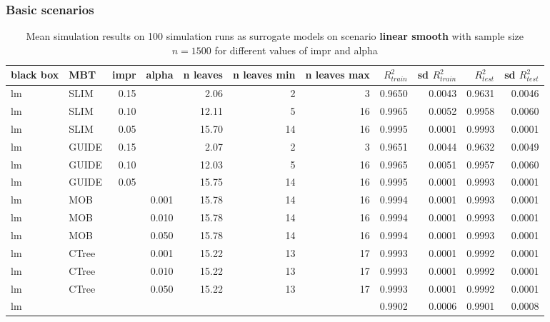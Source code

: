 \subsubsection{Basic scenarios}
\begin{table}[!htb]

\caption{Mean simulation results on 100 simulation runs as surrogate models on scenario \textbf{linear smooth} with sample size $n = 1500$ for different values of impr and alpha}
\centering \tiny
\begin{tabular}[t]{l|l|r|r|r|r|r|r|r|r|r}
\hline
black box & MBT & impr & alpha & n leaves & n leaves min & n leaves max &  $R^2_{train}$ & sd $R^2_{train}$ & $R^2_{test}$ & sd $R^2_{test}$\\
\hline
lm & SLIM & 0.15 & & 2.06 & 2 & 3 & 0.9650 & 0.0043 & 0.9631 & 0.0046\\
lm & SLIM & 0.10 & & 12.11 & 5 & 16 & 0.9965 & 0.0052 & 0.9958 & 0.0060\\
lm & SLIM & 0.05 & & 15.70 & 14 & 16 & 0.9995 & 0.0001 & 0.9993 & 0.0001\\
lm & GUIDE & 0.15 & & 2.07 & 2 & 3 & 0.9651 & 0.0044 & 0.9632 & 0.0049\\
lm & GUIDE & 0.10 & & 12.03 & 5 & 16 & 0.9965 & 0.0051 & 0.9957 & 0.0060\\
lm & GUIDE & 0.05 & & 15.75 & 14 & 16 & 0.9995 & 0.0001 & 0.9993 & 0.0001\\
lm & MOB & & 0.001 & 15.78 & 14 & 16 & 0.9994 & 0.0001 & 0.9993 & 0.0001\\
lm & MOB & & 0.010 & 15.78 & 14 & 16 & 0.9994 & 0.0001 & 0.9993 & 0.0001\\
lm & MOB & & 0.050 & 15.78 & 14 & 16 & 0.9994 & 0.0001 & 0.9993 & 0.0001\\
lm & CTree & & 0.001 & 15.22 & 13 & 17 & 0.9993 & 0.0001 & 0.9992 & 0.0001\\
lm & CTree & & 0.010 & 15.22 & 13 & 17 & 0.9993 & 0.0001 & 0.9992 & 0.0001\\
lm & CTree & & 0.050 & 15.22 & 13 & 17 & 0.9993 & 0.0001 & 0.9992 & 0.0001\\
\hline
lm &  & & & & &  & 0.9902 & 0.0006 & 0.9901 & 0.0008\\
\hline


\end{tabular}
\end{table}
